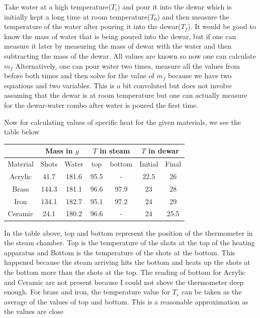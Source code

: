 \documentclass[12pt]{article}
\begin{document}
Take water at a high temperature($T_i$) and pour it into the dewar which is initially kept a long time at room temperature($T_0$) and then measure the temperature of the water after pouring it into the dewar($T_f$).
It would be good to know the mass of water that is being poured into the dewar, but if one can measure it later by measuring the mass of dewar with the water and then subtracting the mass of the dewar.
All values are known so now one can calculate $m_f$
Alternatively, one can pour water two times, measure all the values from before both times and then solve for the value of $m_f$ because we have two equations and two variables.
This is a bit convoluted but does not involve assuming that the dewar is at room temperature but one can actually measure for the dewar-water combo after water is poured the first time.

Now for calculating values of specific heat for the given materials, we see the table below
\begin{table}[!ht]
    \centering
    \begin{tabular}{|c|c|c|c|c|c|c|}
    \hline
            & \multicolumn{2}{c|}{Mass in $g$} & \multicolumn{2}{c|}{$T$ in steam} &\multicolumn{2}{c|}{$T$ in dewar} \\ \hline
        Material & Shots & Water &   top   & bottom & Initial  & Final  \\ \hline
        Acrylic & 41.7 & 181.6 & 95.5 & - & 22.5 & 26 \\ \hline
        Brass & 144.3 & 181.1 & 96.6 & 97.9 & 23 & 28 \\ \hline
        Iron & 134.1 & 182.7 & 95.1 & 97.2 & 24 & 29 \\ \hline
        Ceramic & 24.1 & 180.2 & 96.6 & - & 24 & 25.5 \\ \hline
    \end{tabular}
\end{table}

In the table above, top and bottom represent the position of the thermometer in the steam chamber.
Top is the temperature of the shots at the top of the heating apparatus and Bottom is the temperature of the shots at the bottom.
This happened because the steam arriving hits the bottom and heats up the shots at the bottom more than the shots at the top.
The reading of bottom for Acrylic and Ceramic are not present because I could not shove the thermometer deep enough.
For brass and iron, the temperature value for $T_s$ can be taken as the average of the values of top and bottom.
This is a reasonable approximation as the values are close
\end{document}
